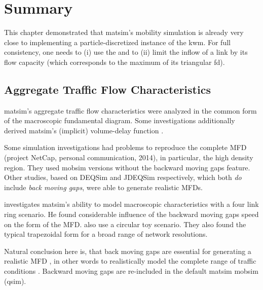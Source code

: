 \section{\label{sec:Summary}Summary}
This chapter demonstrated that \gls{matsim}'s mobility simulation is already
very close to implementing a particle-discretized instance of the
\gls{kwm}. For full consistency, one needs to (i) use the 
and to (ii) limit the inflow of a link by its flow capacity (which
corresponds to the maximum of its triangular \gls{fd}). 


\subsection{Aggregate Traffic Flow Characteristics}
\gls{matsim}'s aggregate traffic flow characteristics were analyzed in the common form of the macroscopic fundamental diagram. Some investigations additionally derived \gls{matsim}'s (implicit) volume-delay function \citep[][]{HorniMontini_STRC_2013}.

Some simulation investigations had problems to reproduce the complete MFD (project NetCap, personal communication, 2014), in particular, the high density region. They used mobsim versions without the backward moving gaps feature. Other studies, based on DEQSim and JDEQSim respectively, which both \emph{do} include \emph{back moving gaps}, were able to generate realistic MFDs. 

\citet[p.81ff][]{Simoni_MastersThesis_2013} investigates \gls{matsim}'s ability to model macroscopic characteristics with a four link ring scenario. He found considerable influence of the backward moving gaps speed on the form of the MFD. \citet[][]{CharyparEtAl_TRB_2009} also use a circular toy scenario. They also found the typical trapezoidal form for a broad range of network resolutions.

Natural conclusion here is, that back moving gaps are essential for generating a realistic MFD , in other words to realistically model the complete range of traffic conditions . Backward moving gaps are re-included in the default \gls{matsim} mobsim (qsim). 

